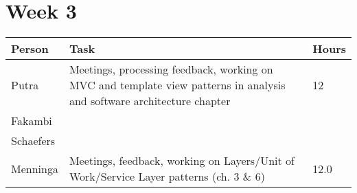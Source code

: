 \section*{Week 3}

\begin{longtable}{p{} p{} p{}}
	\textbf{Person} & \textbf{Task} & \textbf{Hours} \\ \toprule
	Putra           & Meetings, processing feedback, working on MVC and template view patterns in analysis and software architecture chapter & 12 \\ \midrule
	Fakambi         & & \\ \midrule
	Schaefers       & & \\ \midrule
	Menninga        & Meetings, feedback, working on Layers/Unit of Work/Service Layer patterns (ch. 3 \& 6) & 12.0 \\ \bottomrule
\end{longtable}


